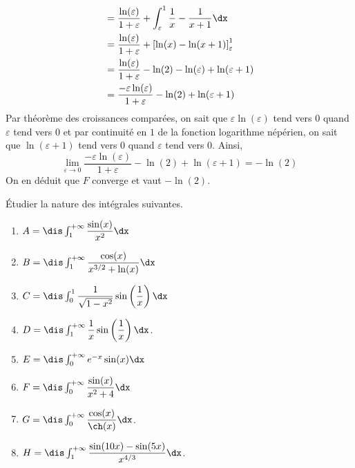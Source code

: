 \documentclass[a4paper,10pt]{report}
\begin{document}
\begin{enumerate}
\begin{align*}
& = \dfrac{\ln(\varepsilon)}{1+\varepsilon} +\int_{\varepsilon}^1 \dfrac{1}{x}- \dfrac{1}{x+1} \dx \\
& = \dfrac{\ln(\varepsilon)}{1+\varepsilon} + \left[\ln(x)- \ln(x+1)\right]_{\varepsilon}^1 \\
& = \dfrac{\ln(\varepsilon)}{1+\varepsilon} - \ln(2) - \ln(\varepsilon)+ \ln(\varepsilon+1) \\
& = \dfrac{-\varepsilon \ln(\varepsilon)}{1+ \varepsilon} - \ln(2) + \ln(\varepsilon+1)
\end{align*}
Par théorème des croissances comparées, on sait que $\varepsilon \ln(\varepsilon)$ tend vers $0$ quand $\varepsilon$ tend vers $0$ et par continuité en $1$ de la fonction logarithme népérien, on sait que $\ln(\varepsilon+1)$ tend vers $0$ quand $\varepsilon$ tend vers $0$. Ainsi,
$$ \lim_{\varepsilon \rightarrow 0} \dfrac{-\varepsilon \ln(\varepsilon)}{1+ \varepsilon} - \ln(2) + \ln(\varepsilon+1) = - \ln(2)$$
On en déduit que $F$ converge et vaut $- \ln(2)$.
\end{enumerate}

\begin{Exa} Étudier la nature des intégrales suivantes. 

\begin{multicols}{2}
\begin{enumerate}
\item $A = \dis \int_1^{+ \infty} \dfrac{\sin(x)}{x^2} \dx$
\item $B = \dis \int_1^{+ \infty} \dfrac{\cos(x)}{x^{3/2}+\ln(x)} \dx$
\item $C = \dis \int_0^{1} \dfrac{1}{\sqrt{1-x^2}} \sin \left(\dfrac{1}{x}\right) \dx$
\item $D= \dis \int_1^{+ \infty} \dfrac{1}{x} \sin \left(\dfrac{1}{x}\right) \dx$.
\item $E= \dis \int_{0}^{+ \infty} e^{-x} \sin(x) \dx$
\item $F= \dis \int_0^{+\infty} \dfrac{\sin(x)}{x^2+4} \dx$
\item $G= \dis \int_0^{+ \infty} \dfrac{\cos(x)}{\ch(x)} \dx$.
\item $H= \dis \int_1^{+\infty} \dfrac{\sin(10x)-\sin(5x)}{x^{4/3}} \dx$.
\end{enumerate}
\end{multicols}
\vspace{0.1cm}
\end{Exa}

\corr 
\end{document}
